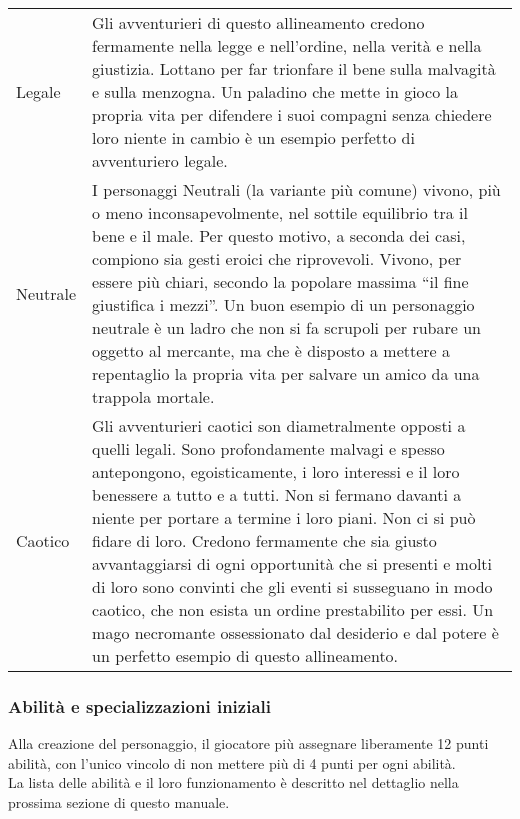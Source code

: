 \documentclass[../manuale_main.tex]{subfiles}
\begin{document}
\renewcommand{\arraystretch}{1.5}
\begin{tabularx}{\linewidth}{ l X }
Legale&Gli avventurieri di questo allineamento credono fermamente nella legge e nell'ordine, nella verità e nella giustizia. Lottano per far trionfare il bene sulla malvagità e sulla menzogna. Un paladino che mette in gioco la propria vita per difendere i suoi compagni senza chiedere loro niente in cambio è un esempio perfetto di avventuriero legale.\\

Neutrale&I personaggi Neutrali (la variante più comune) vivono, più o meno inconsapevolmente, nel sottile equilibrio tra il bene e il male. Per questo motivo, a seconda dei casi, compiono sia gesti eroici che riprovevoli. Vivono, per essere più chiari, secondo la popolare massima “il fine giustifica i mezzi”. Un buon esempio di un personaggio neutrale è un ladro che non si fa scrupoli per rubare un oggetto al mercante, ma che è disposto a mettere a repentaglio la propria vita per salvare un amico da una trappola mortale.\\

Caotico&Gli avventurieri caotici son diametralmente opposti a quelli legali. Sono profondamente malvagi e spesso antepongono, egoisticamente, i loro interessi e il loro benessere a tutto e a tutti. Non si fermano davanti a niente per portare a termine i loro piani. Non ci si può fidare di loro. Credono fermamente che sia giusto avvantaggiarsi di ogni opportunità che si presenti e molti di loro sono convinti che gli eventi si susseguano in modo caotico, che non esista un ordine prestabilito per essi. Un mago necromante ossessionato dal desiderio e dal potere è un perfetto esempio di questo allineamento.\\
\end{tabularx}

\subsubsection{Abilità e specializzazioni iniziali}
Alla creazione del personaggio, il giocatore più assegnare liberamente 12 punti abilità, con l'unico vincolo di non mettere più di 4 punti per ogni abilità.\\
La lista delle abilità e il loro funzionamento è descritto nel dettaglio nella prossima sezione di questo manuale.
\end{document}
